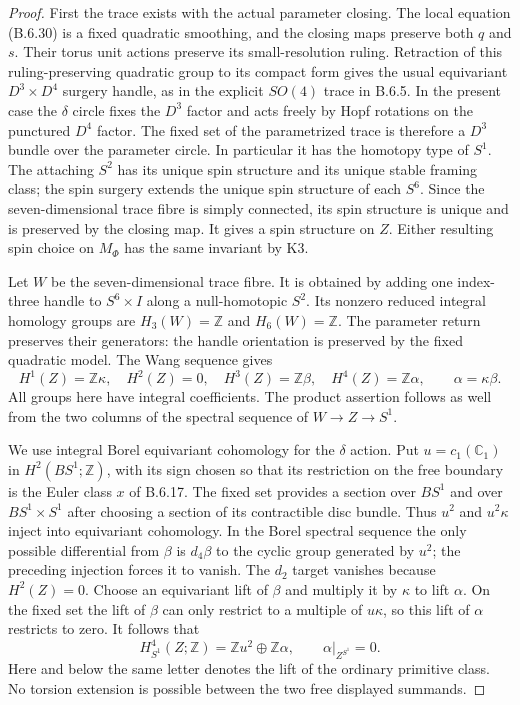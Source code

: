 \begin{proof}
First the trace exists with the actual parameter closing.
The local equation (B.6.30) is a fixed quadratic smoothing,
and the closing maps preserve both $q$ and $s$.  Their torus
unit actions preserve its small-resolution ruling.  Retraction
of this ruling-preserving quadratic group to its compact form
gives the usual equivariant $D^3\times D^4$ surgery handle,
as in the explicit $SO(4)$ trace in B.6.5.  In the present
case the $\delta$ circle fixes the $D^3$ factor and acts
freely by Hopf rotations on the punctured $D^4$ factor.
The fixed set of the parametrized trace is therefore a
$D^3$ bundle over the parameter circle.  In particular it
has the homotopy type of $S^1$.  The attaching $S^2$ has
its unique spin structure and its unique stable framing
class; the spin surgery extends the unique spin structure
of each $S^6$.  Since the seven-dimensional trace fibre
is simply connected, its spin structure is unique and
is preserved by the closing map.  It gives a spin
structure on $Z$.  Either resulting spin choice on
$M_\Phi$ has the same invariant by K3.

Let $W$ be the seven-dimensional trace fibre.  It is obtained
by adding one index-three handle to $S^6\times I$ along
a null-homotopic $S^2$.  Its nonzero reduced integral
homology groups are $H_3(W)=\mathbb Z$ and
$H_6(W)=\mathbb Z$.  The parameter return preserves
their generators: the handle orientation is preserved
by the fixed quadratic model.  The Wang sequence gives
\[
 H^1(Z)=\mathbb Z\kappa,\quad H^2(Z)=0,\quad
 H^3(Z)=\mathbb Z\beta,\quad
 H^4(Z)=\mathbb Z\alpha,\qquad \alpha=\kappa\beta.
 \tag{B.6.35}
\]
All groups here have integral coefficients.  The product
assertion follows as well from the two columns of the
spectral sequence of $W\to Z\to S^1$.

We use integral Borel equivariant cohomology for the
$\delta$ action.  Put $u=c_1(\mathbb C_1)$ in
$H^2(BS^1;\mathbb Z)$, with its sign chosen so that
its restriction on the free boundary is the Euler
class $x$ of B.6.17.  The fixed set provides a section
over $BS^1$ and over $BS^1\times S^1$ after choosing
a section of its contractible disc bundle.  Thus
$u^2$ and $u^2\kappa$ inject into equivariant cohomology.
In the Borel spectral sequence the only possible
differential from $\beta$ is $d_4\beta$ to the cyclic
group generated by $u^2$; the preceding injection forces
it to vanish.  The $d_2$ target vanishes because $H^2(Z)=0$.
Choose an equivariant lift of $\beta$ and multiply it by
$\kappa$ to lift $\alpha$.  On the fixed set the lift
of $\beta$ can only restrict to a multiple of $u\kappa$,
so this lift of $\alpha$ restricts to zero.  It follows that
\[
 H^4_{S^1}(Z;\mathbb Z)=\mathbb Zu^2\oplus\mathbb Z\alpha,
 \qquad \alpha|_{Z^{S^1}}=0.
 \tag{B.6.36}
\]
Here and below the same letter denotes the lift of the
ordinary primitive class.  No torsion extension is
possible between the two free displayed summands.


\end{proof}
